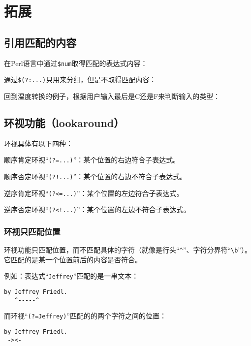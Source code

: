 \chapter{拓展}

\section{引用匹配的内容}

在Perl语言中通过\verb|$num|取得匹配的表达式内容：



通过\verb|$(?:...)|只用来分组，但是不取得匹配内容：



回到温度转换的例子，根据用户输入最后是C还是F来判断输入的类型：




\section{环视功能（lookaround）}

环视具体有以下四种：

顺序肯定环视“\verb|(?=...)|”：某个位置的右边符合子表达式。

顺序否定环视“\verb|(?!...)|”：某个位置的右边不符合子表达式。

逆序肯定环视“\verb|(?<=...)|”：某个位置的左边符合子表达式。

逆序否定环视“\verb|(?<!...)|”：某个位置的左边不符合子表达式。

\subsection{环视只匹配位置}

环视功能只匹配位置，而不匹配具体的字符（就像是行头“\verb|^|”、字符分界符“\verb|\b|”）。它匹配的是某一个位置前后的内容是否符合。

例如：表达式“\verb|Jeffrey|”匹配的是一串文本：

\begin{verbatim}
by Jeffrey Friedl.
   ^-----^
\end{verbatim}

而环视“\verb|(?=Jeffrey)|”匹配的的两个字符之间的位置：

\begin{verbatim}
by Jeffrey Friedl.
 -><-
\end{verbatim}

